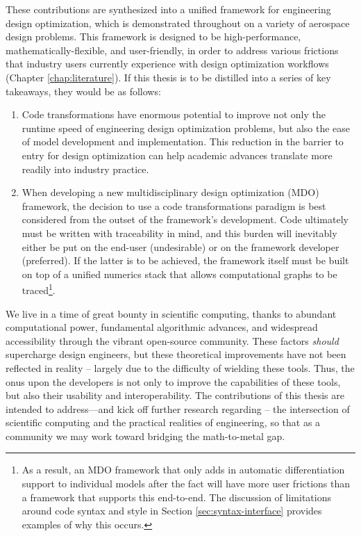 These contributions are synthesized into a unified framework for engineering design optimization, which is demonstrated throughout on a variety of aerospace design problems. This framework is designed to be high-performance, mathematically-flexible, and user-friendly, in order to address various frictions that industry users currently experience with design optimization workflows (Chapter \ref{chap:literature}). If this thesis is to be distilled into a series of key takeaways, they would be as follows:
\begin{enumerate}
    \item Code transformations have enormous potential to improve not only the runtime speed of engineering design optimization problems, but also the ease of model development and implementation. This reduction in the barrier to entry for design optimization can help academic advances translate more readily into industry practice.
    \item When developing a new multidisciplinary design optimization (MDO) framework, the decision to use a code transformations paradigm is best considered from the outset of the framework's development. Code ultimately must be written with traceability in mind, and this burden will inevitably either be put on the end-user (undesirable) or on the framework developer (preferred). If the latter is to be achieved, the framework itself must be built on top of a unified numerics stack that allows computational graphs to be traced\footnote{As a result, an MDO framework that only adds in automatic differentiation support to individual models after the fact will have more user frictions than a framework that supports this end-to-end. The discussion of limitations around code syntax and style in Section \ref{sec:syntax-interface} provides examples of why this occurs.}.
\end{enumerate}

\noindent We live in a time of great bounty in scientific computing, thanks to abundant computational power, fundamental algorithmic advances, and widespread accessibility through the vibrant open-source community. These factors \emph{should} supercharge design engineers, but these theoretical improvements have not been reflected in reality -- largely due to the difficulty of wielding these tools. Thus, the onus upon the developers is not only to improve the capabilities of these tools, but also their usability and interoperability. The contributions of this thesis are intended to address—and kick off further research regarding -- the intersection of scientific computing and the practical realities of engineering, so that as a community we may work toward bridging the math-to-metal gap.